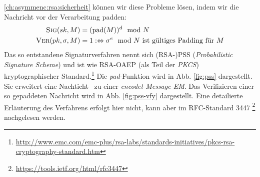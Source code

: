 \ref{ch:asymmenc:rsa:sicherheit} können wir diese Probleme lösen, indem
wir die Nachricht vor der Verarbeitung padden:\indexRSAPSS
\begin{align*} 
  \textsc{Sig}(sk,M) &= (\text{pad}(M))^d \mod N\\
  \textsc{Ver}(pk,\sigma,M) &= 1 :\Leftrightarrow \sigma^e \mod N \text{
                               ist gültiges Padding für } M
\end{align*} 
Das so entstandene Signaturverfahren nennt sich (RSA-)PSS
(\emph{Probabilistic Signature Scheme}) und ist wie RSA-OAEP (als Teil
der \emph{PKCS}) kryptographischer
Standard.\footnote{\url{http://www.emc.com/emc-plus/rsa-labs/standards-initiatives/pkcs-rsa-cryptography-standard.htm}}
Die \textit{pad}-Funktion wird in Abb. \ref{fig:pss} dargestellt. Sie
erweitert eine Nachticht \plaint~zu einer \textit{encodet Message
  EM}. Das Verifizieren einer so gepaddeten Nachricht wird in
Abb. \ref{fig:pss-vfy} dargestellt. Eine detailierte Erläuterung des
Verfahrens erfolgt hier nicht, kann aber im RFC-Standard 3447
\footnote{\url{https://tools.ietf.org/html/rfc3447}} nachgelesen werden.

